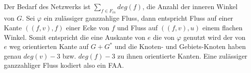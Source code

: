 
Der Bedarf des Netzwerks ist $\sum_{f \in F_{in}}{deg(f)}$, die Anzahl der inneren Winkel von $G$. Sei $\varphi$ ein zulässiger ganzzahlige Fluss, dann entspricht Fluss auf einer Kante $((f,v),f)$ einer Ecke von $f$ und Fluss auf $((f,v),u)$ einem flachen Winkel. Somit entspricht die eine Auskante von $e$ die von $\varphi$ genutzt wird der von $e$ weg orientierten Kante auf $G+G^*$ und die Knoten- und Gebiets-Knoten haben genau $deg(v)-3$ bzw. $deg(f)-3$ zu ihnen orientierte Kanten. Eine zulässiger ganzzahliger Fluss kodiert also ein FAA.